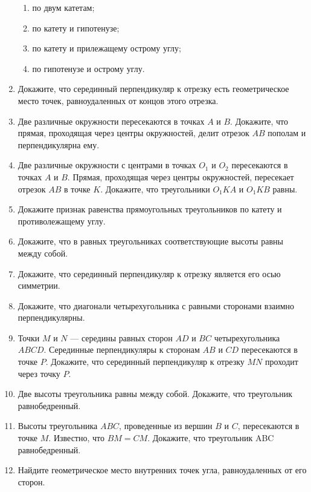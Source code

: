 \documentclass[10pt, a4paper]{article}
\begin{document}
\begin{enumerate}
\begin{enumerate}[label=\asbuk*)]
			\item по двум катетам;
			\item по катету и гипотенузе;
			\item по катету и прилежащему острому углу;
			\item по гипотенузе и острому углу.
		\end{enumerate}
		\item {} Докажите, что серединный перпендикуляр к отрезку есть геометрическое место точек, равноудаленных от концов этого отрезка.
		\item {} Две различные окружности пересекаются в точках $A$ и $B$. Докажите, что прямая, проходящая через центры окружностей, делит отрезок $AB$ пополам и перпендикулярна ему.
		\item {} Две различные окружности с центрами в точках $O_1$ и $O_2$ пересекаются в точках $A$ и $B$. Прямая, проходящая через центры окружностей, пересекает отрезок $AB$ в точке $K$. Докажите, что треугольники $O_1KA$ и $O_1KB$ равны.
		\item {} Докажите признак равенства прямоугольных треугольников по катету и противолежащему углу.
		\item {} Докажите, что в равных треугольниках соответствующие высоты равны между собой.
		\item {} Докажите, что серединный перпендикуляр к отрезку является его осью симметрии.
		\item {} Докажите, что диагонали четырехугольника с равными сторонами взаимно перпендикулярны.
		\item {} Точки $M$ и $N$ --- середины равных сторон $AD$ и $BC$ четырехугольника $ABCD$. Серединные перпендикуляры к сторонам $AB$ и $CD$ пересекаются в точке $P$. Докажите, что серединный перпендикуляр к отрезку $MN$ проходит через точку $P$.
		\item {} Две высоты треугольника равны между собой. Докажите, что треугольник равнобедренный.
		\item {} Высоты треугольника $ABC$, проведенные из вершин $B$ и $C$, пересекаются в точке $M$. Известно, что $BM = CM$. Докажите, что треугольник ABC равнобедренный.
		\item {} Найдите геометрическое место внутренних точек угла, равноудаленных от его сторон.

\end{enumerate}
\end{document}
